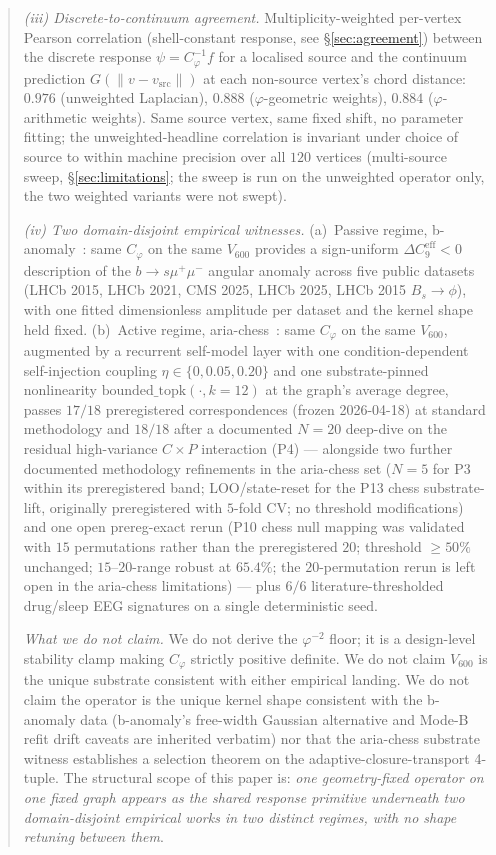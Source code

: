 \documentclass[11pt]{article}
\newcommand{\Ph}{\varphi}
\newcommand{\Cph}{C_{\Ph}}
\newcommand{\Rsixhundred}{V_{600}}
\begin{document}
\begin{abstract}
\noindent\emph{(iii) Discrete-to-continuum agreement.}
Multiplicity-weighted per-vertex Pearson correlation (shell-constant
response, see \S\ref{sec:agreement}) between the discrete response
$\psi = \Cph^{-1} f$ for a localised source and the continuum
prediction $G(\|v - v_{\mathrm{src}}\|)$ at each non-source
vertex's chord distance: $0.976$ (unweighted Laplacian), $0.888$
($\Ph$-geometric weights), $0.884$ ($\Ph$-arithmetic weights).
Same source vertex, same fixed shift, no parameter fitting; the
unweighted-headline correlation is invariant under choice of source
to within machine precision over all $120$ vertices (multi-source
sweep, \S\ref{sec:limitations}; the sweep is run on the unweighted
operator only, the two weighted variants were not swept).

\noindent\emph{(iv) Two domain-disjoint empirical witnesses.}
(a)~Passive regime, b-anomaly~\citep{SmartBAnomaly2026}: same
$\Cph$ on the same $\Rsixhundred$ provides a sign-uniform
$\Delta C_{9}^{\mathrm{eff}} < 0$ description of the
$b\to s\mu^{+}\mu^{-}$ angular anomaly across five public datasets
(LHCb 2015, LHCb 2021, CMS 2025, LHCb 2025, LHCb 2015 $B_s\to\phi$),
with one fitted dimensionless amplitude per dataset and the kernel
shape held fixed. (b)~Active regime,
aria-chess~\citep{SmartAriaChess2026}: same $\Cph$ on the same
$\Rsixhundred$, augmented by a recurrent self-model layer with one
condition-dependent self-injection coupling
$\eta\in\{0,0.05,0.20\}$ and one substrate-pinned nonlinearity
$\mathrm{bounded\_topk}(\cdot, k\!=\!12)$ at the graph's average
degree, passes $17/18$ preregistered correspondences (frozen
2026-04-18) at standard methodology and $18/18$ after a documented
$N\!=\!20$ deep-dive on the residual high-variance
$C\!\times\!P$ interaction (P4) — alongside two further documented
methodology refinements in the aria-chess set ($N\!=\!5$ for P3
within its preregistered band; LOO/state-reset for the P13 chess
substrate-lift, originally preregistered with $5$-fold CV; no
threshold modifications) and one open prereg-exact rerun (P10
chess null mapping was validated with $15$ permutations rather
than the preregistered $20$; threshold $\geq 50\%$ unchanged;
$15$--$20$-range robust at $65.4\%$; the $20$-permutation rerun
is left open in the aria-chess limitations) — plus $6/6$
literature-thresholded drug/sleep EEG signatures on a single
deterministic seed.

\noindent\emph{What we do not claim.}
We do not derive the $\Ph^{-2}$ floor; it is a design-level
stability clamp making $\Cph$ strictly positive definite. We do
not claim $\Rsixhundred$ is the unique substrate consistent with
either empirical landing. We do not claim the operator is the
unique kernel shape consistent with the b-anomaly data
(b-anomaly's free-width Gaussian alternative and Mode-B refit
drift caveats are inherited verbatim) nor that the
aria-chess substrate witness establishes a selection theorem on
the adaptive-closure-transport 4-tuple. The structural scope of
this paper is: \emph{one geometry-fixed operator on one fixed
graph appears as the shared response primitive underneath two domain-disjoint
empirical works in two distinct regimes, with no shape retuning
between them}.
\end{abstract}
\end{document}
